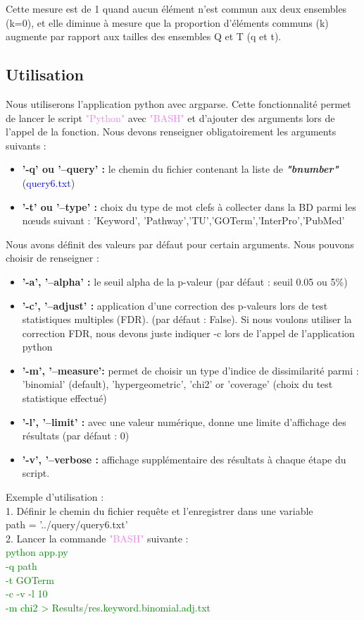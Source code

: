\documentclass[a4paper,11pt,openright]{report}
\begin{document}
Cette mesure est de 1 quand aucun élément n'est commun aux deux ensembles (k=0), et elle diminue à mesure que la proportion d'éléments communs (k) augmente par rapport aux tailles des ensembles Q et T (q et t).

		\subsection{Utilisation}
Nous utiliserons l'application python avec argparse. Cette fonctionnalité permet de lancer le script \textcolor{violet}{"Python"} avec \textcolor{violet}{"BASH"} et d'ajouter des arguments lors de l'appel de la fonction. Nous devons renseigner obligatoirement les arguments suivants :
\begin{itemize}
	\item \textbf{'-q' ou '--query' : } le chemin du fichier contenant la liste de \textbf{\textit{"bnumber"}} (\textcolor{blue}{query6.txt}) 
	\item \textbf{'-t' ou '--type' : } choix du type de mot clefs à collecter dans la BD parmi les nœuds suivant : 'Keyword', 'Pathway','TU','GOTerm','InterPro','PubMed'
\end{itemize}

Nous avons définit des valeurs par défaut pour certain arguments. Nous pouvons choisir de renseigner :
\begin{itemize}
	\item \textbf{'-a', '--alpha' : } le seuil alpha de la p-valeur (par défaut : seuil 0.05 ou 5\%)
	\item \textbf{'-c', '--adjust' : } application d'une correction des p-valeurs lors de test statistiques multiples (FDR). (par défaut : False). Si nous voulons utiliser la correction FDR, nous devons juste indiquer -c lors de l'appel de l'application python
	\item \textbf{'-m', '--measure': } permet de choisir un type d'indice de dissimilarité parmi : 'binomial' (default), 'hypergeometric', 'chi2' or 'coverage' (choix du test statistique effectué)
	\item \textbf{'-l', '--limit' : } avec une valeur numérique, donne une limite d'affichage des résultats (par défaut : 0)
	\item \textbf{'-v', '--verbose : } affichage supplémentaire des résultats à chaque étape du script.
\end{itemize}  
  

Exemple d’utilisation : \\
1. Définir le chemin du fichier requête et l'enregistrer dans une variable \\
path = '../query/query6.txt' \\
2. Lancer la commande \textcolor{violet}{"BASH"} suivante : \\
\textcolor{green}{python app.py \ \\
-q path \ \\ 
-t GOTerm \ \\
-c -v -l 10\ \\
-m chi2 > Results/res.keyword.binomial.adj.txt} \\ 
\end{document}
